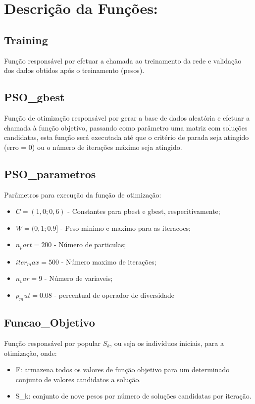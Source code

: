 \documentclass{IEEEtran}
\begin{document}
\section{Descrição da Funções:}

\subsection{Training}
Função responsável por efetuar a chamada  ao treinamento da rede e validação dos dados obtidos após o treinamento (pesos).
\subsection{PSO\_gbest}
Função de otimização  responsável por gerar a base de dados aleatória e efetuar a chamada à função objetivo, passando como parâmetro uma matriz com soluções candidatas, esta função será executada até que o critério de parada seja atingido (erro = 0) ou o número de iterações máximo seja atingido.
\subsection{PSO\_parametros}
Parâmetros para execução da função de otimização:
\begin{itemize}
	\item $C = (1,0;0,6)$ - Constantes para pbest e gbest, respecitivamente;
	\item $W = (0,1;0.9]$ - Peso minimo e maximo para as iteracoes;
	\item $n_part = 200$ - Número de particulas;
	\item $iter_max = 500$ - Número maximo de iterações;
	\item $n_var =  9$ - Número de variaveis;
	\item $p_mut = 0.08$ - percentual de operador de diversidade
\end{itemize}
\subsection{Funcao\_Objetivo}
Função responsável por popular $S_k$, ou seja os indivíduos iniciais, para a otimização, onde: 
\begin{itemize}
	\item F:   armazena todos os valores de função objetivo para um determinado
conjunto de valores candidatos a solução.
	\item S\_k:   conjunto de nove pesos por número de soluções candidatas por iteração. 
\end{itemize}
\end{document}
